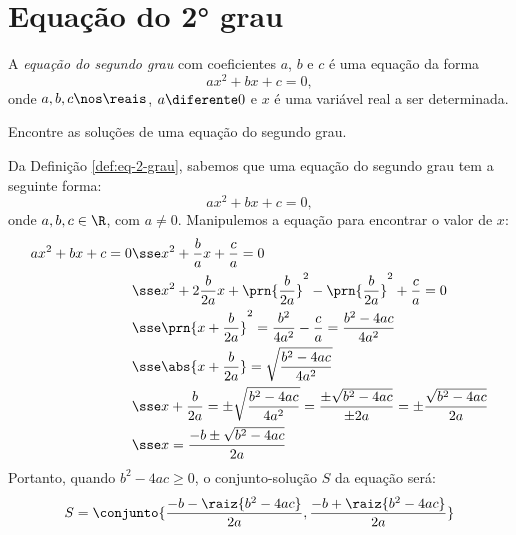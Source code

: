 \section{Equação do 2° grau}

\begin{definition}
    \label{def:eq-2-grau}
    A \emph{equação do segundo grau} com coeficientes $a$, $b$ e $c$ é uma equação da forma 
    \[
        ax^2 + bx + c = 0,
    \]
    onde $a, b, c \nos \reais$, $a \diferente 0$ e $x$ é uma variável real a ser determinada.
\end{definition}

\begin{example}
    \label{ex:sol-2-grau}
    Encontre as soluções de uma equação do segundo grau.
\end{example}

\begin{solution}
    Da Definição \ref{def:eq-2-grau}, sabemos que uma equação do segundo grau tem a seguinte forma:
    \[
        ax^2 + bx + c = 0,
    \]
    onde $a,b,c \in \R$, com $a \ne 0$. Manipulemos a equação para encontrar o valor de $x$:
    \begin{align*}
        ax^2 + bx + c = 0 & \sse x^2+\frac{b}{a}x +\frac{c}{a}=0 \\ 
                          & \sse x^2+2\frac{b}{2a}x+\prn{\frac{b}{2a}}^2-\prn{\frac{b}{2a}}^2+\frac{c}{a}=0\\ 
                          & \sse \prn{x+\frac{b}{2a}}^2=\frac{b^2}{4a^2}-\frac{c}{a}=\frac{b^2 -4ac}{4a^2}\\ 
                          & \sse \abs{x+\frac{b}{2a}} = \sqrt{\frac{b^2-4ac}{4a^2}}\\ 
                          & \sse x+\frac{b}{2a}=\pm\sqrt{\frac{b^2-4ac}{4a^2}}=\frac{\pm\sqrt{b^2-4ac}}{\pm2a}=\pm\frac{\sqrt{b^2-4ac}}{2a}\\ 
                          & \sse x=\frac{-b\pm\sqrt{b^2-4ac}}{2a}\\ 
    \end{align*}
    Portanto, quando $b^2-4ac \ge 0$, o conjunto-solução $S$ da equação será:
    \begin{align*}
        S = \conjunto{\dfrac {-b - \raiz{b^2 - 4ac}} {2a}, \dfrac{-b + \raiz{b^2 - 4ac}} {2a}}
    \end{align*}
\end{solution}

\begin{onlineact}
\end{onlineact}

